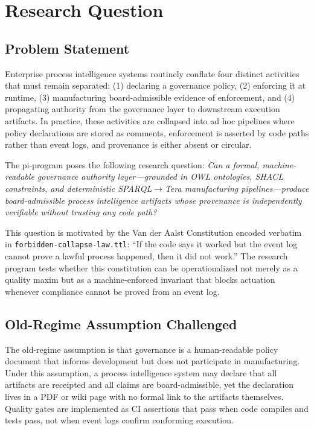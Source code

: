 
\section{Research Question}
\label{sec:research-pi-program-rq}

\subsection{Problem Statement}
\label{sec:research-pi-program-rq-problem}

Enterprise process intelligence systems routinely conflate four distinct activities that must remain separated: (1) declaring a governance policy, (2) enforcing it at runtime, (3) manufacturing board-admissible evidence of enforcement, and (4) propagating authority from the governance layer to downstream execution artifacts. In practice, these activities are collapsed into ad hoc pipelines where policy declarations are stored as comments, enforcement is asserted by code paths rather than event logs, and provenance is either absent or circular.

The pi-program poses the following research question: \textit{Can a formal, machine-readable governance authority layer---grounded in OWL ontologies, SHACL constraints, and deterministic SPARQL$\to$Tera manufacturing pipelines---produce board-admissible process intelligence artifacts whose provenance is independently verifiable without trusting any code path?}

This question is motivated by the Van der Aalst Constitution encoded verbatim in \texttt{forbidden-collapse-law.ttl}: ``If the code says it worked but the event log cannot prove a lawful process happened, then it did not work.'' The research program tests whether this constitution can be operationalized not merely as a quality maxim but as a machine-enforced invariant that blocks actuation whenever compliance cannot be proved from an event log.

\subsection{Old-Regime Assumption Challenged}
\label{sec:research-pi-program-rq-oldregime}

The old-regime assumption is that governance is a human-readable policy document that informs development but does not participate in manufacturing. Under this assumption, a process intelligence system may declare that all artifacts are receipted and all claims are board-admissible, yet the declaration lives in a PDF or wiki page with no formal link to the artifacts themselves. Quality gates are implemented as CI assertions that pass when code compiles and tests pass, not when event logs confirm conforming execution.

